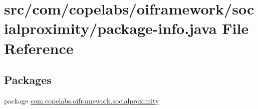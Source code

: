 \hypertarget{package-info_8java}{}\section{src/com/copelabs/oiframework/socialproximity/package-\/info.java File Reference}
\label{package-info_8java}
\subsection*{Packages}
\begin{DoxyCompactItemize}
\item 
package \hyperlink{namespacecom_1_1copelabs_1_1oiframework_1_1socialproximity}{com.\+copelabs.\+oiframework.\+socialproximity}
\end{DoxyCompactItemize}
